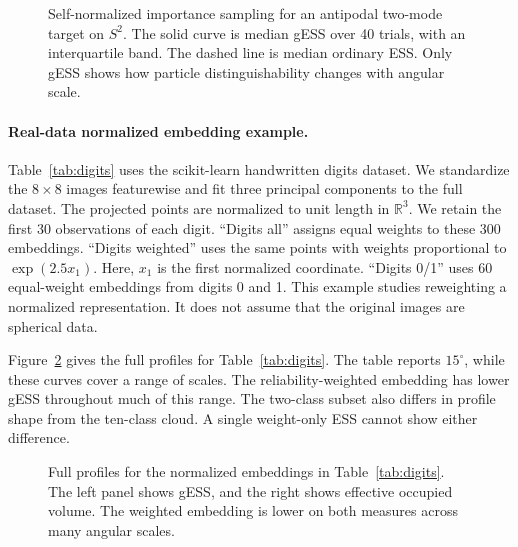 \documentclass[twoside]{article}
\theoremstyle{definition}
\theoremstyle{remark}
\begin{document}
\begin{figure}[t]
\centering

\caption{Self-normalized importance sampling for an antipodal two-mode target on $S^2$. The solid curve is median gESS over 40 trials, with an interquartile band.
The dashed line is median ordinary ESS. Only gESS shows how particle distinguishability changes with angular scale.}
\label{fig:app_snis}
\end{figure}

\paragraph{Real-data normalized embedding example.}
Table~\ref{tab:digits} uses the scikit-learn handwritten digits dataset. We standardize the $8\times8$ images featurewise and fit three principal components to the full dataset. The projected points are normalized to unit length in $\mathbb R^3$. We retain the first 30 observations of each digit. ``Digits all'' assigns equal weights to these 300 embeddings. ``Digits weighted'' uses the same points with weights proportional to $\exp(2.5x_1)$. Here, $x_1$ is the first normalized coordinate. ``Digits 0/1'' uses 60 equal-weight embeddings from digits 0 and 1. This example studies reweighting a normalized representation. It does not assume that the original images are spherical data.

Figure~\ref{fig:app_digits_profiles} gives the full profiles for Table~\ref{tab:digits}. The table reports $15^\circ$, while these curves cover a range of scales. The reliability-weighted embedding has lower gESS throughout much of this range. The two-class subset also differs in profile shape from the ten-class cloud. A single weight-only ESS cannot show either difference.

\begin{figure}[t]
\centering

\caption{Full profiles for the normalized embeddings in Table~\ref{tab:digits}. The left panel shows gESS, and the right shows effective occupied volume.
The weighted embedding is lower on both measures across many angular scales.}
\label{fig:app_digits_profiles}
\end{figure}
\end{document}
